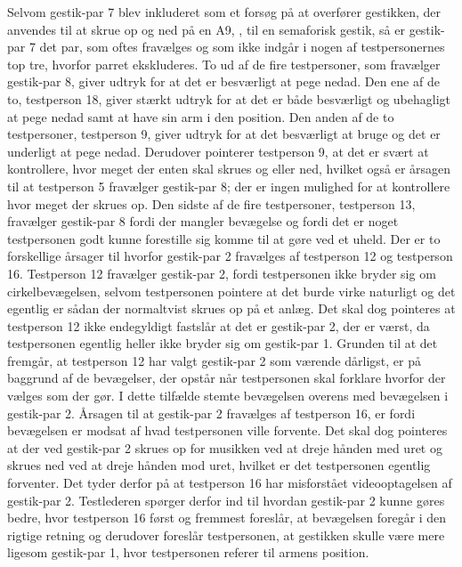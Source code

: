 Selvom gestik-par 7 blev inkluderet som et forsøg på at overfører gestikken, der anvendes til at skrue op og ned på en A9, \parencite{WEB:BeoplayA9}, til en semaforisk gestik, så er gestik-par 7 det par, som oftes fravælges og som ikke indgår i nogen af testpersonernes top tre, hvorfor parret ekskluderes.\blankline
%
To ud af de fire testpersoner, som fravælger gestik-par 8, giver udtryk for at det er besværligt at pege nedad. Den ene af de to, testperson 18, giver stærkt udtryk for at det er både besværligt og ubehagligt at pege nedad samt at have sin arm i den position. Den anden af de to testpersoner, testperson 9, giver udtryk for at det besværligt at bruge og det er underligt at pege nedad. Derudover pointerer testperson 9, at det er svært at kontrollere, hvor meget der enten skal skrues og eller ned, hvilket også er årsagen til at testperson 5 fravælger gestik-par 8; der er ingen mulighed for at kontrollere hvor meget der skrues op. Den sidste af de fire testpersoner, testperson 13, fravælger gestik-par 8 fordi der mangler bevægelse og fordi det er noget testpersonen godt kunne forestille sig komme til at gøre ved et uheld. \blankline 
%
Der er to forskellige årsager til hvorfor gestik-par 2 fravælges af testperson 12 og testperson 16. Testperson 12 fravælger gestik-par 2, fordi testpersonen ikke bryder sig om cirkelbevægelsen, selvom testpersonen pointere at det burde virke naturligt og det egentlig er sådan der normaltvist skrues op på et anlæg. Det skal dog pointeres at testperson 12 ikke endegyldigt fastslår at det er gestik-par 2, der er værst, da testpersonen egentlig heller ikke bryder sig om gestik-par 1. Grunden til at det fremgår, at testperson 12 har valgt gestik-par 2 som værende dårligst, er på baggrund af de bevægelser, der opstår når testpersonen skal forklare hvorfor der vælges som der gør. I dette tilfælde stemte bevægelsen overens med bevægelsen i gestik-par 2. Årsagen til at gestik-par 2 fravælges af testperson 16, er fordi bevægelsen er modsat af hvad testpersonen ville forvente. Det skal dog pointeres at der ved gestik-par 2 skrues op for musikken ved at dreje hånden med uret og skrues ned ved at dreje hånden mod uret, hvilket er det testpersonen egentlig forventer. Det tyder derfor på at testperson 16 har misforstået videooptagelsen af gestik-par 2. Testlederen spørger derfor ind til hvordan gestik-par 2 kunne gøres bedre, hvor testperson 16 først og fremmest foreslår, at bevægelsen foregår i den rigtige retning og derudover foreslår testpersonen, at gestikken skulle være mere ligesom gestik-par 1, hvor testpersonen referer til armens position. 

